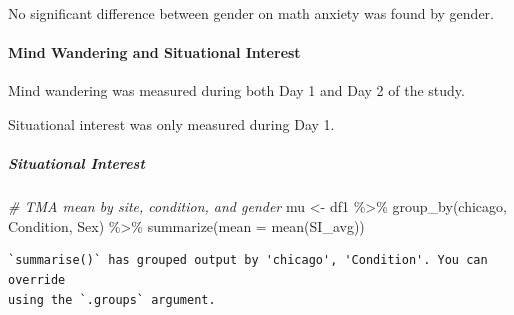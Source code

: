 \documentclass[
  letterpaper,
  DIV=11,
  numbers=noendperiod]{scrartcl}
\let\oldparagraph\paragraph
\renewcommand{\paragraph}[1]{\oldparagraph{#1}\mbox{}}
\let\oldsubparagraph\subparagraph
\renewcommand{\subparagraph}[1]{\oldsubparagraph{#1}\mbox{}}
\newenvironment{Shaded}{\begin{snugshade}}{\end{snugshade}}
\newcommand{\AttributeTok}[1]{\textcolor[rgb]{0.49,0.56,0.16}{#1}}
\newcommand{\CommentTok}[1]{\textcolor[rgb]{0.38,0.63,0.69}{\textit{#1}}}
\newcommand{\FunctionTok}[1]{\textcolor[rgb]{0.02,0.16,0.49}{#1}}
\newcommand{\NormalTok}[1]{\textcolor[rgb]{0.00,0.44,0.13}{#1}}
\newcommand{\OtherTok}[1]{\textcolor[rgb]{0.00,0.44,0.13}{#1}}
\newcommand{\SpecialCharTok}[1]{\textcolor[rgb]{0.25,0.44,0.63}{#1}}
\begin{document}
No significant difference between gender on math anxiety was found by
gender.

\hypertarget{mind-wandering-and-situational-interest}{%
\paragraph{Mind Wandering and Situational
Interest}\label{mind-wandering-and-situational-interest}}

Mind wandering was measured during both Day 1 and Day 2 of the study.

Situational interest was only measured during Day 1.

\hypertarget{situational-interest}{%
\subparagraph{Situational Interest}\label{situational-interest}}

\begin{Shaded}
\begin{Highlighting}[]
\CommentTok{\# TMA mean by site, condition, and gender}
\NormalTok{mu }\OtherTok{\textless{}{-}}\NormalTok{ df1 }\SpecialCharTok{\%\textgreater{}\%} \FunctionTok{group\_by}\NormalTok{(chicago, Condition, Sex) }\SpecialCharTok{\%\textgreater{}\%} \FunctionTok{summarize}\NormalTok{(}\AttributeTok{mean =} \FunctionTok{mean}\NormalTok{(SI\_avg))}
\end{Highlighting}
\end{Shaded}

\begin{verbatim}
`summarise()` has grouped output by 'chicago', 'Condition'. You can override
using the `.groups` argument.
\end{verbatim}
\end{document}
